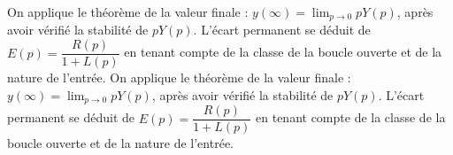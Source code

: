 \begin{corrigebox}[Corrigé]
On applique le théorème de la valeur finale : $y(\infty)=\lim_{p\to0}pY(p)$, après avoir vérifié la stabilité de $pY(p)$. L'écart permanent se déduit de $E(p)=\dfrac{R(p)}{1+L(p)}$ en tenant compte de la classe de la boucle ouverte et de la nature de l'entrée.
On applique le théorème de la valeur finale : $y(\infty)=\lim_{p\to0}pY(p)$, après avoir vérifié la stabilité de $pY(p)$. L'écart permanent se déduit de $E(p)=\dfrac{R(p)}{1+L(p)}$ en tenant compte de la classe de la boucle ouverte et de la nature de l'entrée.
\end{corrigebox}
